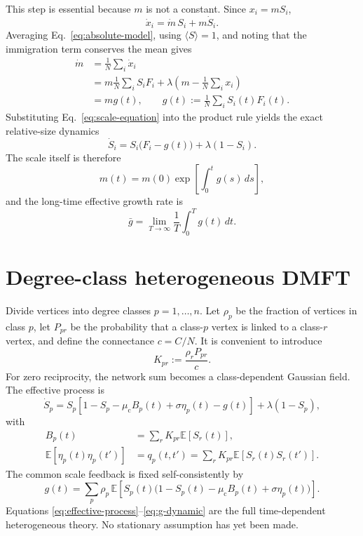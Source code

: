 \documentclass[11pt]{article}
\newcommand{\E}{\mathbb E}
\newcommand{\mc}{\mu_{\mathrm c}}
\begin{document}
This step is essential because $m$ is not a constant.  Since $x_i=mS_i$,
\begin{equation}
  \dot x_i=\dot m\,S_i+m\dot S_i.
  \label{eq:product-rule}
\end{equation}
Averaging Eq.~\eqref{eq:absolute-model}, using $\langle S\rangle=1$, and noting
that the immigration term conserves the mean gives
\begin{align}
  \dot m
  &=\frac1N\sum_i\dot x_i\\
  &=m\frac1N\sum_iS_iF_i
    +\lambda\left(m-\frac1N\sum_i x_i\right)\\
  &=m g(t),
  \qquad
  g(t):=\frac1N\sum_iS_i(t)F_i(t).
  \label{eq:scale-equation}
\end{align}
Substituting Eq.~\eqref{eq:scale-equation} into the product rule yields the
exact relative-size dynamics
\begin{equation}
  \dot S_i=S_i\bigl(F_i-g(t)\bigr)+\lambda(1-S_i).
  \label{eq:share-dynamics}
\end{equation}
The scale itself is therefore
\begin{equation}
  m(t)=m(0)\exp\left[\int_0^t g(s)\,ds\right],
\end{equation}
and the long-time effective growth rate is
\begin{equation}
  \bar g=\lim_{T\to\infty}\frac1T\int_0^Tg(t)\,dt.
  \label{eq:long-run-growth}
\end{equation}

\section{Degree-class heterogeneous DMFT}

Divide vertices into degree classes $p=1,\ldots,n$.  Let $\rho_p$ be the
fraction of vertices in class $p$, let $P_{pr}$ be the probability that a
class-$p$ vertex is linked to a class-$r$ vertex, and define the connectance
$c=C/N$.  It is convenient to introduce
\begin{equation}
  K_{pr}:=\frac{\rho_rP_{pr}}{c}.
  \label{eq:class-kernel}
\end{equation}
For zero reciprocity, the network sum becomes a class-dependent Gaussian field.
The effective process is
\begin{equation}
  \dot S_p
  =S_p\left[1-S_p-\mc B_p(t)+\sigma\eta_p(t)-g(t)\right]
   +\lambda(1-S_p),
  \label{eq:effective-process}
\end{equation}
with
\begin{align}
  B_p(t)&=\sum_rK_{pr}\E[S_r(t)],
  \label{eq:B-dynamic}\\
  \E[\eta_p(t)\eta_p(t')]&=q_p(t,t')
  =\sum_rK_{pr}\E[S_r(t)S_r(t')].
  \label{eq:q-dynamic}
\end{align}
The common scale feedback is fixed self-consistently by
\begin{equation}
  g(t)=\sum_p\rho_p\,
  \E\!\left[S_p(t)\bigl(1-S_p(t)-\mc B_p(t)+\sigma\eta_p(t)\bigr)\right].
  \label{eq:g-dynamic}
\end{equation}
Equations \eqref{eq:effective-process}--\eqref{eq:g-dynamic} are the full
time-dependent heterogeneous theory.  No stationary assumption has yet been
made.
\end{document}
